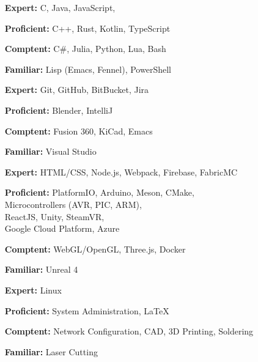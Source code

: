 \documentclass[9pt]{developercv} %
\begin{document}
\begin{minipage}[t]{0.45\textwidth}
	\begin{itemize}
		\item[\textbf{Expert:}] C, Java, JavaScript,
		\item[\textbf{Proficient:}] C++, Rust, Kotlin, TypeScript
		\item[\textbf{Comptent:}] C\#, Julia, Python, Lua, Bash
		\item[\textbf{Familiar:}] Lisp (Emacs, Fennel), PowerShell
	\end{itemize}
\end{minipage}
\hfill
\begin{minipage}[t]{0.5\textwidth}
	\begin{itemize}
		\item[\textbf{Expert:}] Git, GitHub, BitBucket, Jira
		\item[\textbf{Proficient:}] Blender, IntelliJ
		\item[\textbf{Comptent:}] Fusion 360, KiCad, Emacs
		\item[\textbf{Familiar:}] Visual Studio
	\end{itemize}
\end{minipage}

\vspace{1em}

\begin{minipage}[t]{0.45\textwidth}
	\begin{itemize}
		\item[\textbf{Expert:}] HTML/CSS, Node.js, Webpack, Firebase, FabricMC
		\item[\textbf{Proficient:}] PlatformIO, Arduino, Meson, CMake, \\
			Microcontrollers (AVR, PIC, ARM),  \\
			ReactJS, Unity, SteamVR, \\
			Google Cloud Platform, Azure
		\item[\textbf{Comptent:}] WebGL/OpenGL, Three.js, Docker
		\item[\textbf{Familiar:}] Unreal 4
	\end{itemize}
\end{minipage}
\hfill
\begin{minipage}[t]{0.5\textwidth} %
	\begin{itemize}
		\item[\textbf{Expert:}] Linux
		\item[\textbf{Proficient:}] System Administration, \LaTeX
		\item[\textbf{Comptent:}] Network Configuration, CAD, 3D Printing, Soldering
		\item[\textbf{Familiar:}] Laser Cutting
	\end{itemize}
\end{minipage}
\end{document}
